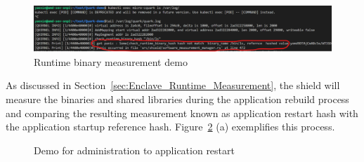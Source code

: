 \begin{figure}[!htb]
    \centering
    \includegraphics[width=1\textwidth]{images/cquark_runtime_runtime_binary_measurement_demo.png}
    \caption[Runtime binary measurement demo]{Runtime binary measurement demo}
    \label{fig:cquark_runtime_runtime_binary_measurement_demo}
\end{figure}



As discussed in Section~\ref{sec:Enclave_Runtime_Measurement}, the shield will measure the binaries and shared libraries during the application rebuild process and comparing the resulting measurement known as application restart hash with the application startup reference hash. Figure~\ref{fig:cquark_application_restart_demo} (a)
exemplifies this process.
\begin{figure}[!htb]

  
    \caption[Demo for  administration to application restart]{Demo for administration to application restart}
    \label{fig:cquark_application_restart_demo}
\end{figure}

